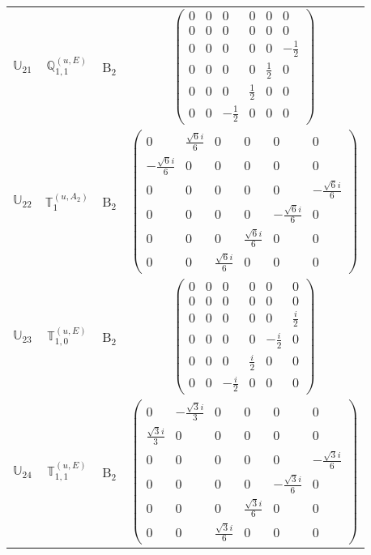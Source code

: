 \documentclass[fleqn,10pt,landscape]{article}
\begin{document}
\begin{itemize}
\begin{center}
\begin{longtable}{c|c|c|c}
$ \mathbb{U}_{21} $ & $\mathbb{Q}_{1,1}^{(u,E)}$ & B$_{2}$ & $\begin{pmatrix} 0 & 0 & 0 & 0 & 0 & 0 \\ 0 & 0 & 0 & 0 & 0 & 0 \\ 0 & 0 & 0 & 0 & 0 & - \frac{1}{2} \\ 0 & 0 & 0 & 0 & \frac{1}{2} & 0 \\ 0 & 0 & 0 & \frac{1}{2} & 0 & 0 \\ 0 & 0 & - \frac{1}{2} & 0 & 0 & 0 \end{pmatrix}$ \\
$ \mathbb{U}_{22} $ & $\mathbb{T}_{1}^{(u,A_{2})}$ & B$_{2}$ & $\begin{pmatrix} 0 & \frac{\sqrt{6} i}{6} & 0 & 0 & 0 & 0 \\ - \frac{\sqrt{6} i}{6} & 0 & 0 & 0 & 0 & 0 \\ 0 & 0 & 0 & 0 & 0 & - \frac{\sqrt{6} i}{6} \\ 0 & 0 & 0 & 0 & - \frac{\sqrt{6} i}{6} & 0 \\ 0 & 0 & 0 & \frac{\sqrt{6} i}{6} & 0 & 0 \\ 0 & 0 & \frac{\sqrt{6} i}{6} & 0 & 0 & 0 \end{pmatrix}$ \\
$ \mathbb{U}_{23} $ & $\mathbb{T}_{1,0}^{(u,E)}$ & B$_{2}$ & $\begin{pmatrix} 0 & 0 & 0 & 0 & 0 & 0 \\ 0 & 0 & 0 & 0 & 0 & 0 \\ 0 & 0 & 0 & 0 & 0 & \frac{i}{2} \\ 0 & 0 & 0 & 0 & - \frac{i}{2} & 0 \\ 0 & 0 & 0 & \frac{i}{2} & 0 & 0 \\ 0 & 0 & - \frac{i}{2} & 0 & 0 & 0 \end{pmatrix}$ \\
$ \mathbb{U}_{24} $ & $\mathbb{T}_{1,1}^{(u,E)}$ & B$_{2}$ & $\begin{pmatrix} 0 & - \frac{\sqrt{3} i}{3} & 0 & 0 & 0 & 0 \\ \frac{\sqrt{3} i}{3} & 0 & 0 & 0 & 0 & 0 \\ 0 & 0 & 0 & 0 & 0 & - \frac{\sqrt{3} i}{6} \\ 0 & 0 & 0 & 0 & - \frac{\sqrt{3} i}{6} & 0 \\ 0 & 0 & 0 & \frac{\sqrt{3} i}{6} & 0 & 0 \\ 0 & 0 & \frac{\sqrt{3} i}{6} & 0 & 0 & 0 \end{pmatrix}$ \\
\end{longtable}
\end{center}


\end{itemize}
\end{document}
